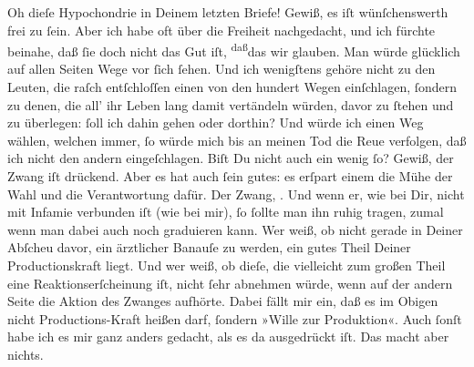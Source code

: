 \pstart
           {\pb}Oh dieſe Hypochondrie in Deinem letzten Briefe!
               Gewiß, es iſt wünſchenswerth frei zu{ }ſein. Aber ich habe oft über die Freiheit
               nachgedacht, und ich fürchte beinahe, daß{ }ſie doch nicht das Gut iſt, \substVorne{}\textsuperscript{daß}\substDazwischen{}das\substHinten{} wir glauben. Man würde glücklich auf allen Seiten Wege vor{ }ſich{ }ſehen. Und
               ich wenigſtens gehöre nicht zu den Leuten, die raſch entſchloſſen einen von den
               hundert Wegen einſchlagen,{ }ſondern zu denen, die all’ ihr Leben lang damit vertändeln
               würden, davor zu{ }ſtehen {\pb}und zu überlegen:{ }ſoll ich
               dahin gehen oder dorthin? Und würde ich einen Weg wählen, welchen immer,{ }ſo würde
               mich bis an meinen Tod die Reue verfolgen, daß ich nicht den andern eingeſchlagen.
               Biſt Du nicht auch ein wenig{ }ſo? Gewiß, der Zwang iſt drückend. Aber es hat auch{ }ſein
               gutes: es erſpart einem die Mühe der Wahl und die Verantwortung dafür. Der Zwang,
                  \label{K_L02621-11v}\label{K_L02621-11}. Und wenn er, wie bei Dir, nicht mit Infamie verbunden iſt (wie
               bei mir),{ }ſo{ }ſollte man ihn {\pb}ruhig tragen, zumal
               wenn man dabei auch noch graduieren kann. Wer weiß, ob nicht gerade in Deiner Abſcheu
               davor, ein ärztlicher  Banauſe zu werden, ein
               gutes Theil Deiner Productionskraft liegt. Und wer weiß, ob dieſe, die vielleicht zum
               großen Theil eine Reaktionserſcheinung iſt, nicht{ }ſehr abnehmen würde, wenn auf der
               andern Seite die Aktion des Zwanges aufhörte. Dabei fällt mir ein, daß es im Obigen
               nicht Productions-Kraft heißen darf,{ }ſondern »Wille zur Produktion«. Auch{ }ſonſt habe
               ich es mir ganz {\pb}anders gedacht, als es da
               ausgedrückt iſt. Das macht aber nichts.\pend
           
